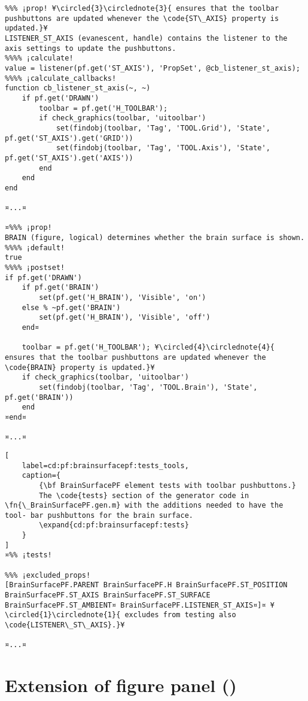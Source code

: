 \documentclass{tufte-handout}
\begin{document}
\begin{lstlisting}
%%% ¡prop! ¥\circled{3}\circlednote{3}{ ensures that the toolbar pushbuttons are updated whenever the \code{ST\_AXIS} property is updated.}¥
LISTENER_ST_AXIS (evanescent, handle) contains the listener to the axis settings to update the pushbuttons.
%%%% ¡calculate!
value = listener(pf.get('ST_AXIS'), 'PropSet', @cb_listener_st_axis); 
%%%% ¡calculate_callbacks!
function cb_listener_st_axis(~, ~)
    if pf.get('DRAWN')
        toolbar = pf.get('H_TOOLBAR');
        if check_graphics(toolbar, 'uitoolbar')
            set(findobj(toolbar, 'Tag', 'TOOL.Grid'), 'State', pf.get('ST_AXIS').get('GRID'))
            set(findobj(toolbar, 'Tag', 'TOOL.Axis'), 'State', pf.get('ST_AXIS').get('AXIS'))
        end
    end
end

¤...¤

¤%%% ¡prop!
BRAIN (figure, logical) determines whether the brain surface is shown.
%%%% ¡default!
true
%%%% ¡postset!
if pf.get('DRAWN')
    if pf.get('BRAIN')
        set(pf.get('H_BRAIN'), 'Visible', 'on')
    else % ~pf.get('BRAIN') 
        set(pf.get('H_BRAIN'), 'Visible', 'off')
    end¤

    toolbar = pf.get('H_TOOLBAR'); ¥\circled{4}\circlednote{4}{ ensures that the toolbar pushbuttons are updated whenever the \code{BRAIN} property is updated.}¥
    if check_graphics(toolbar, 'uitoolbar')
        set(findobj(toolbar, 'Tag', 'TOOL.Brain'), 'State', pf.get('BRAIN'))
    end
¤end¤

¤...¤
\end{lstlisting}

\begin{lstlisting}[
	label=cd:pf:brainsurfacepf:tests_tools,
	caption={
		{\bf BrainSurfacePF element tests with toolbar pushbuttons.}
		The \code{tests} section of the generator code in \fn{\_BrainSurfacePF.gen.m} with the additions needed to have the tool- bar pushbuttons for the brain surface.
		\expand{cd:pf:brainsurfacepf:tests}
	}
]
¤%% ¡tests!

%%% ¡excluded_props! 
[BrainSurfacePF.PARENT BrainSurfacePF.H BrainSurfacePF.ST_POSITION BrainSurfacePF.ST_AXIS BrainSurfacePF.ST_SURFACE BrainSurfacePF.ST_AMBIENT¤ BrainSurfacePF.LISTENER_ST_AXIS¤]¤ ¥\circled{1}\circlednote{1}{ excludes from testing also \code{LISTENER\_ST\_AXIS}.}¥

¤...¤
\end{lstlisting}

\clearpage

\section{Extension of figure panel ()}
\end{document}

